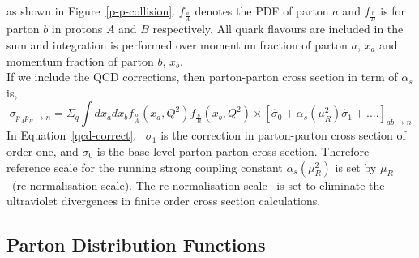as shown in Figure~\ref{p-p-collision}. $f_{\frac{a}{A}}$ denotes the PDF of parton $a$ and $f_{\frac{b}{B}}$ is for parton $b$ in protons $A$ and $B$ respectively. All quark flavours are included in the sum and integration is performed over momentum fraction of parton $a$, $x_{a}$ and momentum fraction of parton $b$, $x_{b}$.\\
If we include the QCD corrections, then parton-parton cross section in term of $\alpha_{s}$ is,
\begin{equation}\label{qcd-correct}
\sigma_{p_{A}p_{B}\rightarrow n}=\Sigma_{q}\int dx_{a}dx_{b}f_{\frac{a}{A}}(x_{a},Q^{2})f_{\frac{b}{B}}(x_{b},Q^{2})\times[\hat{\sigma}_{0}+\alpha_{s}(\mu_{R}^{2})\hat{\sigma}_{1}+....]_{ab\rightarrow n}
\end{equation}
In Equation~\ref{qcd-correct},~ $\sigma_{1}$ is the correction in parton-parton cross section of order one, and $\sigma_{0}$ is the base-level parton-parton cross section. Therefore reference scale for the running strong coupling constant $\alpha_{s}(\mu_{R}^{2})$ is set by $\mu_{R}$~(re-normalisation scale). The re-normalisation scale~\cite{Mukhi:2019yrf} is set to eliminate the ultraviolet divergences in finite order cross section calculations.

\subsection{Parton Distribution Functions}

